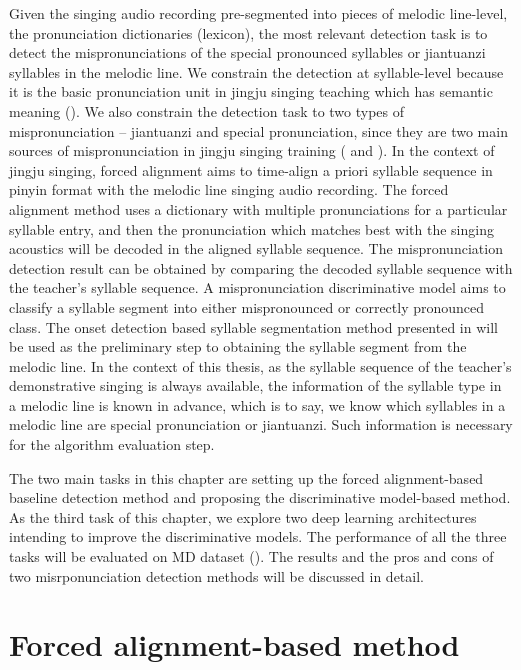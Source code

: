 Given the singing audio recording pre-segmented into pieces of melodic line-level, the pronunciation dictionaries (lexicon), the most relevant detection task is to detect the mispronunciations of the special pronounced syllables or jiantuanzi syllables in the melodic line. We constrain the detection at syllable-level because it is the basic pronunciation unit in jingju singing teaching which has semantic meaning (). We also constrain the detection task to two types of mispronunciation -- jiantuanzi and special pronunciation, since they are two main sources of mispronunciation in jingju singing training ( and ). In the context of jingju singing, forced alignment aims to time-align a priori syllable sequence in pinyin format with the melodic line singing audio recording. The forced alignment method uses a dictionary with multiple pronunciations for a particular syllable entry, and then the pronunciation which matches best with the singing acoustics will be decoded in the aligned syllable sequence. The mispronunciation detection result can be obtained by comparing the decoded syllable sequence with the teacher's syllable sequence. A mispronunciation discriminative model aims to classify a syllable segment into either mispronounced or correctly pronounced class. The onset detection based syllable segmentation method presented in  will be used as the preliminary step to obtaining the syllable segment from the melodic line. In the context of this thesis, as the syllable sequence of the teacher's demonstrative singing is always available, the information of the syllable type in a melodic line is known in advance, which is to say, we know which syllables in a melodic line are special pronunciation or jiantuanzi. Such information is necessary for the algorithm evaluation step.

The two main tasks in this chapter are setting up the forced alignment-based baseline detection method and proposing the discriminative model-based method. As the third task of this chapter, we explore two deep learning architectures intending to improve the discriminative models. The performance of all the three tasks will be evaluated on MD dataset (). The results and the pros and cons of two misrponunciation detection methods will be discussed in detail.

\section{Forced alignment-based method}

